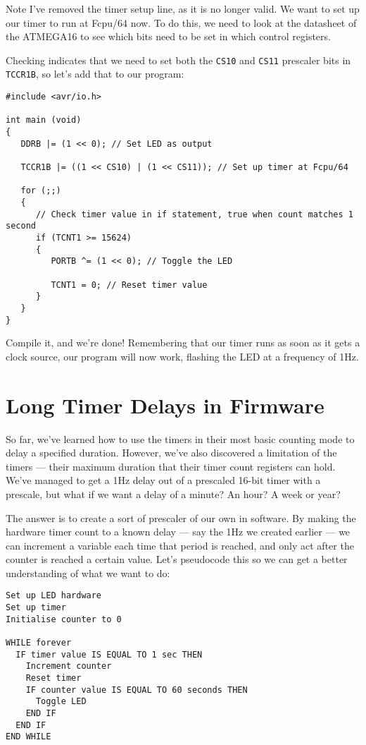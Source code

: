 \documentclass[a4paper,oneside]{book}
\begin{document}
Note I've removed the timer setup line, as it is no longer valid. We want to set up our timer to run at Fcpu/64 now. To do this, we need to look at the datasheet of the ATMEGA16 to see which bits need to be set in which control registers.

Checking indicates that we need to set both the \texttt{CS10} and \texttt{CS11} prescaler bits in \texttt{TCCR1B}, so let's add that to our program: 

\begin{center}
\begin{lstlisting}
#include <avr/io.h>

int main (void)
{
   DDRB |= (1 << 0); // Set LED as output

   TCCR1B |= ((1 << CS10) | (1 << CS11)); // Set up timer at Fcpu/64

   for (;;)
   {
      // Check timer value in if statement, true when count matches 1 second
      if (TCNT1 >= 15624)
      {
         PORTB ^= (1 << 0); // Toggle the LED

         TCNT1 = 0; // Reset timer value
      }
   }
}
\end{lstlisting}
\end{center}

Compile it, and we're done! Remembering that our timer runs as soon as it gets a clock source, our program will now work, flashing the LED at a frequency of 1Hz.

\label{chp:LongFWDelays}
\chapter{Long Timer Delays in Firmware}

So far, we've learned how to use the timers in their most basic counting mode to delay a specified duration. However, we've also discovered a limitation of the timers --- their maximum duration that their timer count registers can hold. We've managed to get a 1Hz delay out of a prescaled 16-bit timer with a prescale, but what if we want a delay of a minute? An hour? A week or year?

The answer is to create a sort of prescaler of our own in software. By making the hardware timer count to a known delay --- say the 1Hz we created earlier --- we can increment a variable each time that period is reached, and only act after the counter is reached a certain value. Let's pseudocode this so we can get a better understanding of what we want to do: 

\begin{center}
\begin{lstlisting}[keywordstyle=\color{black},commentstyle=\color{black}]
Set up LED hardware
Set up timer
Initialise counter to 0

WHILE forever
  IF timer value IS EQUAL TO 1 sec THEN
    Increment counter
    Reset timer
    IF counter value IS EQUAL TO 60 seconds THEN
      Toggle LED
    END IF
  END IF
END WHILE
\end{lstlisting}
\end{center}
\end{document}
